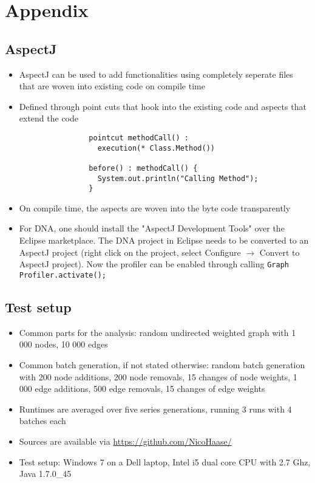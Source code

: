 \section{Appendix}
\subsection{AspectJ} \label{sec:aspectj}
	\begin{itemize}
		\item AspectJ can be used to add functionalities using completely
			seperate files that are woven into existing code on compile time
		\item Defined through point cuts that hook into the existing code and aspects that
			extend the code
	
			\begin{verbatim}
				pointcut methodCall() :
				  execution(* Class.Method())
				  
				before() : methodCall() {
				  System.out.println("Calling Method");
				}
			\end{verbatim}
		
		\item On compile time, the aspects are woven into the byte code transparently
		\item For DNA, one should install the "AspectJ Development Tools" over the Eclipse
			marketplace. The DNA project in Eclipse needs to be converted to an AspectJ project
			(right click on the project, select Configure $\rightarrow$ Convert to AspectJ
			project). Now the profiler can be enabled through calling \texttt{Graph\allowbreak
			Profiler.\allowbreak activate();}
		
	\end{itemize}
\subsection{Test setup} \label{sec:testSetup}
	\begin{itemize}
		\item Common parts for the analysis: random undirected weighted graph with 1 000 nodes,
			10 000 edges
		\item Common batch generation, if not stated otherwise: random batch generation with 200
			node additions, 200 node removals, 15 changes of node weights, 1 000 edge additions,
			500 edge removals, 15 changes of edge weights
		\item Runtimes are averaged over five series generations, running 3 runs with 4 batches
			each
		\item Sources are available via \url{https://github.com/NicoHaase/}
		\item Test setup: Windows 7 on a Dell laptop, Intel i5 dual core CPU with 2.7 Ghz, Java
			1.7.0\_45
	\end{itemize}